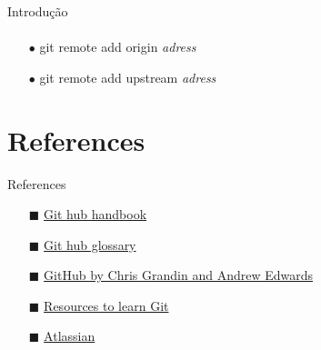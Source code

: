 \documentclass[xcolor=dvipsnames,t]{beamer}
\begin{document}
\begin{frame}{Introdução}
\framesubtitle{}
\vfill	

\begin{itemize}
	\item[$\bullet$] git remote add origin \textit{adress}
	\item[$\bullet$] git remote add upstream \textit{adress}	
\end{itemize}
%	
\end{frame}

\section{References}
\begin{frame}[allowframebreaks]{References}
	\begin{itemize}
		
	\item[$ \blacksquare $] \href{https://guides.github.com/introduction/git-handbook/}{\color{blue}Git hub handbook}
	\item[$ \blacksquare $] \href{https://help.github.com/articles/github-glossary/}{\color{blue} Git hub glossary}
	\item[$ \blacksquare $] \href{https://github.com/pbs-assess/git-course}{\color{blue} GitHub by Chris Grandin and Andrew Edwards}
	\item[$ \blacksquare $] \href{https://try.github.io/}{\color{blue} Resources to learn Git}
	\item[$ \blacksquare $] \href{https://www.atlassian.com/git}{\color{blue} Atlassian} 			
	\end{itemize}
	
	
%	
\end{frame}
\end{document}
